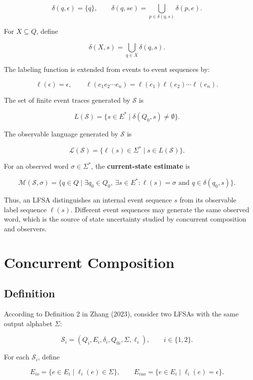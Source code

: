 \documentclass[11pt]{article}
\begin{document}
\[
\delta(q,\epsilon)=\{q\},
\qquad
\delta(q,se)=\bigcup_{p\in\delta(q,s)}\delta(p,e).
\]

For $X\subseteq Q$, define

\[
\delta(X,s)=\bigcup_{q\in X}\delta(q,s).
\]

The labeling function is extended from events to event sequences by: 

\[
\ell(\epsilon)=\epsilon,
\qquad
\ell(e_1e_2\cdots e_n)
=\ell(e_1)\ell(e_2)\cdots\ell(e_n).
\]

The set of finite event traces generated by $\mathcal S$ is

\[
L(\mathcal S)
=\{s\in E^*\mid\delta(Q_0,s)\neq\emptyset\}.
\]

The observable language generated by $\mathcal S$ is

\[
\mathcal L(\mathcal S)
=\{\ell(s)\in\Sigma^*\mid s\in L(\mathcal S)\}.
\]

For an observed word $\sigma\in\Sigma^*$, the \textbf{current-state estimate} is

\[
\mathcal M(\mathcal S,\sigma)
=\{q\in Q\mid
\exists q_0\in Q_0,\ 
\exists s\in E^*:
\ell(s)=\sigma
\text{ and }
q\in\delta(q_0,s)\}.
\]

Thus, an LFSA distinguishes an internal event sequence $s$ from its observable label sequence $\ell(s)$. Different event sequences may generate the same observed word, which is the source of state uncertainty studied by concurrent composition and observers.



\section{Concurrent Composition}

\subsection{Definition}

According to Definition 2 in Zhang (2023), consider two LFSAs with the same output alphabet $\Sigma$:

\[
\mathcal S_i=(Q_i,E_i,\delta_i,Q_{0i},\Sigma,\ell_i),
\qquad i\in\{1,2\}.
\]

For each $\mathcal S_i$, define

\[
E_{io}=\{e\in E_i\mid\ell_i(e)\in\Sigma\},
\qquad
E_{iuo}=\{e\in E_i\mid\ell_i(e)=\epsilon\}.
\]
\end{document}
